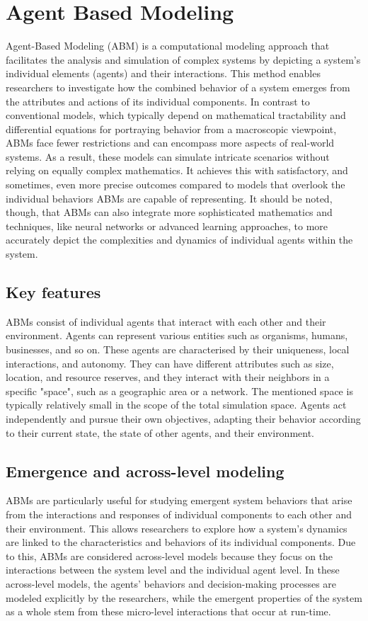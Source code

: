 \section{Agent Based Modeling}
    Agent-Based Modeling (ABM) is a computational modeling approach that facilitates the analysis and simulation of complex systems by depicting a system's individual elements (agents) and their interactions\cite{railsback2019agent}. This method enables researchers to investigate how the combined behavior of a system emerges from the attributes and actions of its individual components. In contrast to conventional models, which typically depend on mathematical tractability and differential equations for portraying behavior from a macroscopic viewpoint, ABMs face fewer restrictions and can encompass more aspects of real-world systems\cite{bonabeau2002agent}. As a result, these models can simulate intricate scenarios without relying on equally complex mathematics. It achieves this with satisfactory, and sometimes, even more precise outcomes compared to models that overlook the individual behaviors ABMs are capable of representing. It should be noted, though, that ABMs can also integrate more sophisticated mathematics and techniques, like neural networks or advanced learning approaches, to more accurately depict the complexities and dynamics of individual agents within the system.

\subsection{Key features}
    ABMs consist of individual agents that interact with each other and their environment. Agents can represent various entities such as organisms, humans, businesses, and so on. These agents are characterised by their uniqueness, local interactions, and autonomy. They can have different attributes such as size, location, and resource reserves, and they interact with their neighbors in a specific "space", such as a geographic area or a network\cite{railsback2019agent}. The mentioned space is typically relatively small in the scope of the total simulation space. Agents act independently and pursue their own objectives, adapting their behavior according to their current state, the state of other agents, and their environment.

\subsection{Emergence and across-level modeling}
    ABMs are particularly useful for studying emergent system behaviors that arise from the interactions and responses of individual components to each other and their environment. This allows researchers to explore how a system's dynamics are linked to the characteristics and behaviors of its individual components. Due to this, ABMs are considered across-level models because they focus on the interactions between the system level and the individual agent level\cite{railsback2019agent}. In these across-level models, the agents' behaviors and decision-making processes are modeled explicitly by the researchers, while the emergent properties of the system as a whole stem from these micro-level interactions that occur at run-time.

